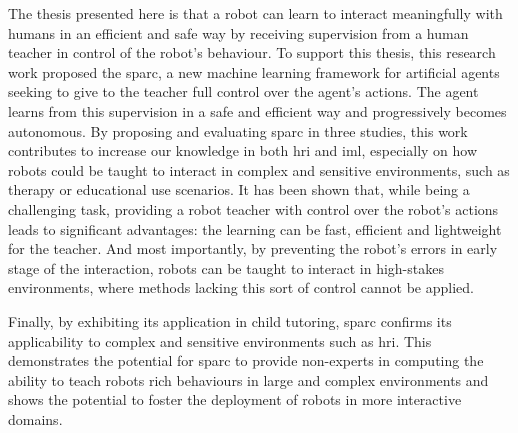 The thesis presented here is that a robot can learn to interact meaningfully with humans in an efficient and safe way by receiving supervision from a human teacher in control of the robot's behaviour. 
%
%
To support this thesis, this research work proposed the \acrfull{sparc}, a new machine learning framework for artificial agents seeking to give to the teacher full control over the agent's actions. The agent learns from this supervision in a safe and efficient way and progressively becomes autonomous. By proposing and evaluating \gls{sparc} in three studies, this work contributes to increase our knowledge in both \gls{hri} and \gls{iml}, especially on how robots could be taught to interact in complex and sensitive environments, such as therapy or educational use scenarios. It has been shown that, while being a challenging task, providing a robot teacher with control over the robot's actions leads to significant advantages: the learning can be fast, efficient and lightweight for the teacher. And most importantly, by preventing the robot's errors in early stage of the interaction, robots can be taught to interact in high-stakes environments, where methods lacking this sort of control cannot be applied.

Finally, by exhibiting its application in child tutoring, \gls{sparc} confirms its applicability to complex and sensitive environments such as \gls{hri}. This demonstrates the potential for \gls{sparc} to provide non-experts in computing the ability to teach robots rich behaviours in large and complex environments and shows the potential to foster the deployment of robots in more interactive domains.
